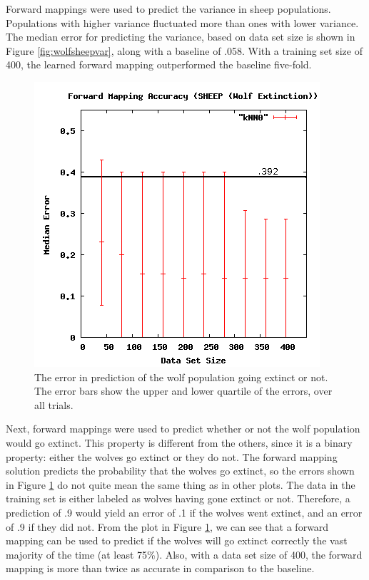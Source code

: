 Forward mappings were used to predict the variance in sheep populations.
Populations with higher variance fluctuated more than ones with lower variance.
The median error for predicting the variance, based on data set size is shown in Figure \ref{fig:wolfsheepvar}, along with a baseline of .058.
With a training set size of 400, the learned forward mapping outperformed the baseline five-fold.

\begin{figure}[ht]
\centering
\includegraphics[scale=.5]{images/results_wolfsheep/fm-wolf-extict.png}
\caption{The error in prediction of the wolf population going extinct or not.
The error bars show the upper and lower quartile of the errors, over all trials.}
\label{fig:wolfsheepextinct}
\end{figure}

Next, forward mappings were used to predict whether or not the wolf population would go extinct.
This property is different from the others, since it is a binary property: either the wolves go extinct or they do not.
The forward mapping solution predicts the probability that the wolves go extinct, so the errors shown in Figure \ref{fig:wolfsheepextinct} do not quite mean the same thing as in other plots.
The data in the training set is either labeled as wolves having gone extinct or not.
Therefore, a prediction of .9 would yield an error of .1 if the wolves went extinct, and an error of .9 if they did not.
From the plot in Figure \ref{fig:wolfsheepextinct}, we can see that a forward mapping can be used to predict if the wolves will go extinct correctly the vast majority of the time (at least 75\%).
Also, with a data set size of 400, the forward mapping is more than twice as accurate in comparison to the baseline.

